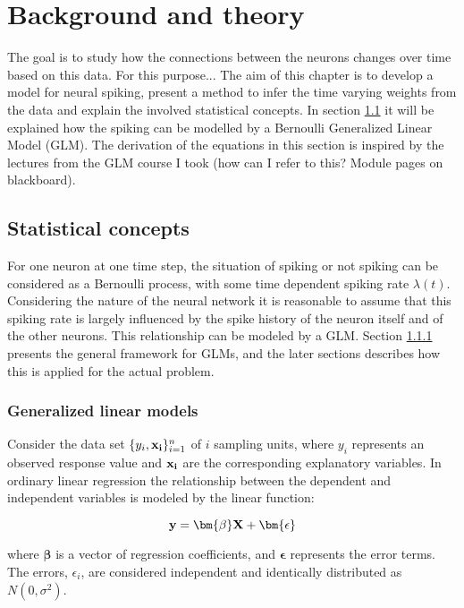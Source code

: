 
\chapter{Background and theory}

The goal is to study how the connections between the neurons changes over time based on this data. For this purpose... The aim of this chapter is to develop a model for neural spiking, present a method to infer the time varying weights from the data and explain the involved statistical concepts. 
In section \ref{GLM} it will be explained how the spiking can be modelled by a Bernoulli Generalized Linear Model (GLM). The derivation of the equations in this section is inspired by the lectures from the GLM course I took (how can I refer to this? Module pages on blackboard).  

\section{Statistical concepts}
\label{GLM}
For one neuron at one time step, the situation of spiking or not spiking can be considered as a Bernoulli process, with some time dependent spiking rate $\lambda (t)$. Considering the nature of the neural network it is reasonable to assume that this spiking rate is largely influenced by the spike history of the neuron itself and of the other neurons. This relationship can be modeled by a GLM. Section \ref{Intro_GLM} presents the general framework for GLMs, and the later sections describes how this is applied for the actual problem. 
\subsection{Generalized linear models}
\label{Intro_GLM}
Consider the data set $ \{y_{i}, \bold{x_{i}}\}_{i=1}^{n} $ of $i$ sampling units, where $y_i$ represents an observed response value and $ \bold{x_i}$ are the corresponding explanatory variables. In ordinary linear regression the relationship between the dependent and independent variables is modeled by the linear function:

\begin{equation}
    \textbf{y} = \bm{\beta}\bf X + \bm{ \epsilon}
\end{equation}

where $\bm{\beta}$ is a vector of regression coefficients, and $\bm{ \epsilon}$ represents the error terms. The errors, $\epsilon_{i}$, are considered independent and identically distributed as $N(0, \sigma^{2})$.

